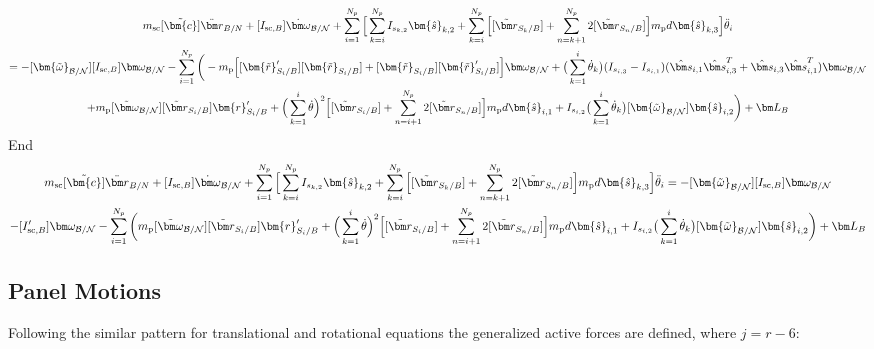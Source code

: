 \documentclass[paper]{aiaaNew}
\begin{document}
\begin{multline}
m_{\text{sc}}[\tilde{\bm{c}}]\ddot{\bm r}_{B/N} + [I_{\text{sc},B}] \dot{\bm\omega}_{\cal B/N} + \sum\limits_{i=1}^{N_p} \Big[\sum^{N_p}_{k=i}I_{s_{k,2}} \bm{\hat{s}}_{k,2} + \sum\limits_{k=i}^{N_p}\Big[ [\tilde{{\bm r}}_{S_{k}/B}] + \sum\limits_{n=k+1}^{N_p}2[\tilde{{\bm r}}_{S_{n}/B}]\Big]m_{\text{p}} d \bm{\hat{s}}_{k,3} \Big] \ddot{\theta}_i \\
= -[\bm{\tilde{\omega}}_{\cal B/N}] [I_{\text{sc},B}] \bm\omega_{\cal B/N} - \sum\limits_{i=1}^{N_p}\bigg( - m_{\text{p}}\Big[[\bm{\tilde{r}}'_{S_i/B}] [\bm{\tilde{r}}_{S_i/B}] + [\bm{\tilde{r}}_{S_i/B}] [\bm{\tilde{r}}'_{S_i/B}]\Big] \bm\omega_{\cal B/N} +\big(\sum^{i}_{k=1}\dot{\theta}_k\big)(I_{s_{i,3}}-I_{s_{i,1}})(\hat{\bm s}_{i,1}\hat{\bm s}_{i,3}^{T}+\hat{\bm s}_{i,3}\hat{\bm s}_{i,1}^{T}) \bm\omega_{\cal B/N} \\
+ m_{\text{p}} [\tilde{\bm\omega}_{\cal B/N}] [\tilde{{\bm r}}_{S_{i}/B}] \bm{r}'_{S_i/B} + \Big( \sum\limits_{k=1}^{i} \dot{\theta}\Big)^2 \Big[[\tilde{{\bm r}}_{S_{i}/B}] + \sum\limits_{n=i+1}^{N_p}2[\tilde{{\bm r}}_{S_{n}/B}]\Big] m_{\text{p}} d \bm{\hat{s}}_{i,1}
+ I_{s_{i,2}} \big(\sum^{i}_{k=1}\dot{\theta}_k\big) [\bm{\tilde{\omega}}_{\cal B/N}] \bm{\hat{s}}_{i,2} \bigg) + \bm L_B
\end{multline}
End
\begin{multline}
m_{\text{sc}}[\tilde{\bm{c}}]\ddot{\bm r}_{B/N} + [I_{\text{sc},B}] \dot{\bm\omega}_{\cal B/N} + \sum\limits_{i=1}^{N_p} \Big[\sum^{N_p}_{k=i}I_{s_{k,2}} \bm{\hat{s}}_{k,2} + \sum\limits_{k=i}^{N_p}\Big[ [\tilde{{\bm r}}_{S_{k}/B}] + \sum\limits_{n=k+1}^{N_p}2[\tilde{{\bm r}}_{S_{n}/B}]\Big]m_{\text{p}} d \bm{\hat{s}}_{k,3} \Big] \ddot{\theta}_i
= -[\bm{\tilde{\omega}}_{\cal B/N}] [I_{\text{sc},B}] \bm\omega_{\cal B/N}\\ - [I'_{\text{sc},B}] \bm\omega_{\cal B/N} - \sum\limits_{i=1}^{N_p}\bigg( m_{\text{p}} [\tilde{\bm\omega}_{\cal B/N}] [\tilde{{\bm r}}_{S_{i}/B}] \bm{r}'_{S_i/B} + \Big( \sum\limits_{k=1}^{i} \dot{\theta}\Big)^2 \Big[[\tilde{{\bm r}}_{S_{i}/B}] + \sum\limits_{n=i+1}^{N_p}2[\tilde{{\bm r}}_{S_{n}/B}]\Big] m_{\text{p}} d \bm{\hat{s}}_{i,1}
+ I_{s_{i,2}} \big(\sum^{i}_{k=1}\dot{\theta}_k\big) [\bm{\tilde{\omega}}_{\cal B/N}] \bm{\hat{s}}_{i,2} \bigg) + \bm L_B
\label{eq:rotmot}
\end{multline}

\subsection{Panel Motions}
Following the similar pattern for translational and rotational equations the generalized active forces are defined, where $j=r-6$:
\end{document}

